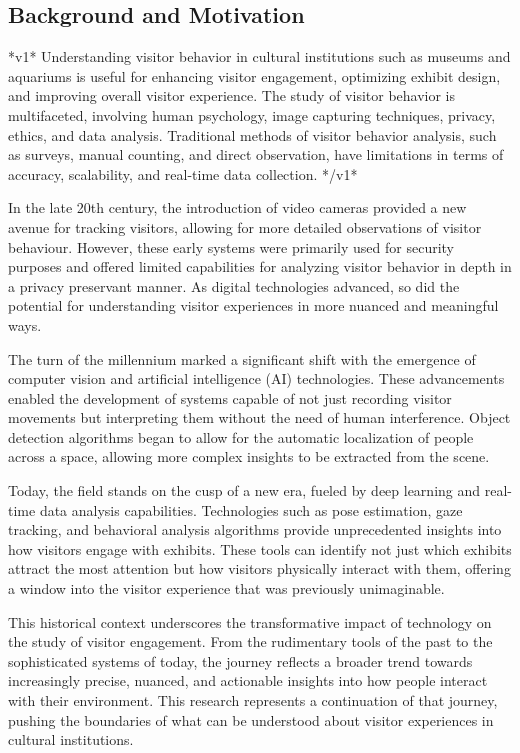 \subsection{Background and Motivation}

*v1*
Understanding visitor behavior in cultural institutions such as museums and aquariums is useful for enhancing visitor engagement, optimizing exhibit design, and improving overall visitor experience. The study of visitor behavior is multifaceted, involving human psychology, image capturing techniques, privacy, ethics, and data analysis. Traditional methods of visitor behavior analysis, such as surveys, manual counting, and direct observation, have limitations in terms of accuracy, scalability, and real-time data collection.
*/v1*

In the late 20th century, the introduction of video cameras provided a new avenue for tracking visitors, allowing for more detailed observations of visitor behaviour. However, these early systems were primarily used for security purposes and offered limited capabilities for analyzing visitor behavior in depth in a privacy preservant manner. As digital technologies advanced, so did the potential for understanding visitor experiences in more nuanced and meaningful ways.

The turn of the millennium marked a significant shift with the emergence of computer vision and artificial intelligence (AI) technologies. These advancements enabled the development of systems capable of not just recording visitor movements but interpreting them without the need of human interference. Object detection algorithms began to allow for the automatic localization of people across a space, allowing more complex insights to be extracted from the scene.

Today, the field stands on the cusp of a new era, fueled by deep learning and real-time data analysis capabilities. Technologies such as pose estimation, gaze tracking, and behavioral analysis algorithms provide unprecedented insights into how visitors engage with exhibits. These tools can identify not just which exhibits attract the most attention but how visitors physically interact with them, offering a window into the visitor experience that was previously unimaginable.


This historical context underscores the transformative impact of technology on the study of visitor engagement. From the rudimentary tools of the past to the sophisticated systems of today, the journey reflects a broader trend towards increasingly precise, nuanced, and actionable insights into how people interact with their environment. This research represents a continuation of that journey, pushing the boundaries of what can be understood about visitor experiences in cultural institutions.

